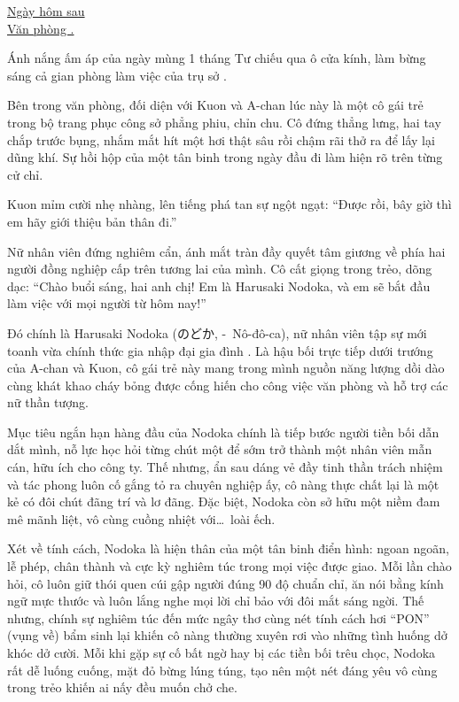 \documentclass[../main.tex]{subfiles}
\begin{document}
\begin{center}
  \uline{Ngày hôm sau\\Văn phòng \hll.}
\end{center}

Ánh nắng ấm áp của ngày mùng 1 tháng Tư chiếu qua ô cửa kính, làm bừng sáng cả gian phòng làm việc của trụ sở \hll.

Bên trong văn phòng, đối diện với Kuon và A-chan lúc này là một cô gái trẻ trong bộ trang phục công sở phẳng phiu, chỉn chu. Cô đứng thẳng lưng, hai tay chắp trước bụng, nhắm mắt hít một hơi thật sâu rồi chậm rãi thở ra để lấy lại dũng khí. Sự hồi hộp của một tân binh trong ngày đầu đi làm hiện rõ trên từng cử chỉ.

Kuon mỉm cười nhẹ nhàng, lên tiếng phá tan sự ngột ngạt: ``Được rồi, bây giờ thì em hãy giới thiệu bản thân đi.''

Nữ nhân viên đứng nghiêm cẩn, ánh mắt tràn đầy quyết tâm giương về phía hai người đồng nghiệp cấp trên tương lai của mình. Cô cất giọng trong trẻo, dõng dạc: ``Chào buổi sáng, hai anh chị! Em là Harusaki Nodoka, và em sẽ bắt đầu làm việc với mọi người từ hôm nay!''

\chrint

Đó chính là Harusaki Nodoka (のどか, -\ Nô-đô-ca), nữ nhân viên tập sự mới toanh vừa chính thức gia nhập đại gia đình \hll. Là hậu bối trực tiếp dưới trướng của A-chan và Kuon, cô gái trẻ này mang trong mình nguồn năng lượng dồi dào cùng khát khao cháy bỏng được cống hiến cho công việc văn phòng và hỗ trợ các nữ thần tượng.


Mục tiêu ngắn hạn hàng đầu của Nodoka chính là tiếp bước người tiền bối dẫn dắt mình, nỗ lực học hỏi từng chút một để sớm trở thành một nhân viên mẫn cán, hữu ích cho công ty. Thế nhưng, ẩn sau dáng vẻ đầy tinh thần trách nhiệm và tác phong luôn cố gắng tỏ ra chuyên nghiệp ấy, cô nàng thực chất lại là một kẻ có đôi chút đãng trí và lơ đãng. Đặc biệt, Nodoka còn sở hữu một niềm đam mê mãnh liệt, vô cùng cuồng nhiệt với\dots\ loài ếch.

Xét về tính cách, Nodoka là hiện thân của một tân binh điển hình: ngoan ngoãn, lễ phép, chân thành và cực kỳ nghiêm túc trong mọi việc được giao. Mỗi lần chào hỏi, cô luôn giữ thói quen cúi gập người đúng 90 độ chuẩn chỉ, ăn nói bằng kính ngữ mực thước và luôn lắng nghe mọi lời chỉ bảo với đôi mắt sáng ngời. Thế nhưng, chính sự nghiêm túc đến mức ngây thơ cùng nét tính cách hơi ``PON'' (vụng về) bẩm sinh lại khiến cô nàng thường xuyên rơi vào những tình huống dở khóc dở cười. Mỗi khi gặp sự cố bất ngờ hay bị các tiền bối trêu chọc, Nodoka rất dễ luống cuống, mặt đỏ bừng lúng túng, tạo nên một nét đáng yêu vô cùng trong trẻo khiến ai nấy đều muốn chở che.
\end{document}
